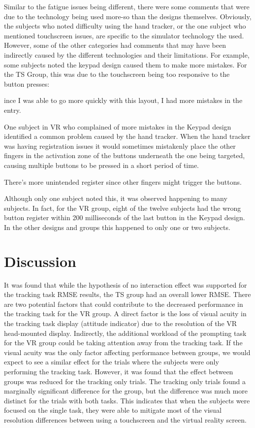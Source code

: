 Similar to the fatigue issues being different, there were some comments that were due to the technology being used more-so than the designs themselves.
Obviously, the subjects who noted difficulty using the hand tracker, or the one subject who mentioned touchscreen issues, are specific to the simulator technology the used.
However, some of the other categories had comments that may have been indirectly caused by the different technologies and their limitations.
For example, some subjects noted the keypad design caused them to make more mistakes.
For the TS Group, this was due to the touchscreen being too responsive to the button presses:
\begin{displayquote}[TS Subject]
    ince I was able to go more quickly with this layout, I had more mistakes in the entry.
\end{displayquote}
One subject in VR who complained of more mistakes in the Keypad design identified a common problem caused by the hand tracker.
When the hand tracker was having registration issues it would sometimes mistakenly place the other fingers in the activation zone of the buttons underneath the one being targeted, causing multiple buttons to be pressed in a short period of time.
\begin{displayquote}[VR Subject]
    There's more unintended register since other fingers might trigger the buttons.
\end{displayquote}
Although only one subject noted this, it was observed happening to many subjects.
In fact, for the VR group, eight of the twelve subjects had the wrong button register within 200 milliseconds of the last button in the Keypad design.
In the other designs and groups this happened to only one or two subjects.


\section{Discussion}
\label{sec:de_discussion}


It was found that while the hypothesis of no interaction effect was supported for the tracking task RMSE results, the TS group  had an overall lower RMSE.
There are two potential factors that could contribute to the decreased performance in the tracking task for the VR group.
A direct factor is the loss of visual acuity in the tracking task display (attitude indicator) due to the resolution of the VR head-mounted display.
Indirectly, the additional workload of the prompting task for the VR group could be taking attention away from the tracking task.
If the visual acuity was the only factor affecting performance between groups, we would expect to see a similar effect for the trials where the subjects were only performing the tracking task.
However, it was found that the effect between groups was reduced for the tracking only trials.
The tracking only trials found a marginally significant difference for the group, but the difference was much more distinct for the trials with both tasks.
This indicates that when the subjects were focused on the single task, they were able to mitigate most of the visual resolution differences between using a touchscreen and the virtual reality screen.

